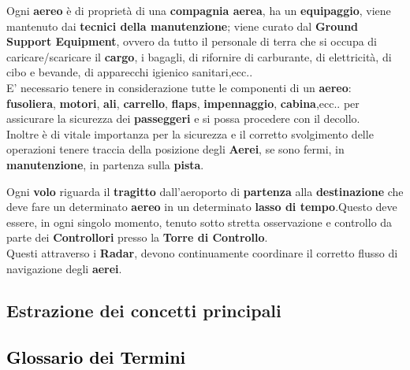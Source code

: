 \textsf{\small Ogni \textbf{aereo} è di proprietà di una \textbf{compagnia aerea}, ha un \textbf{equipaggio}, viene mantenuto dai \textbf{tecnici della manutenzione}; viene curato dal \textbf{Ground Support Equipment}, ovvero da tutto il personale di terra che si occupa di caricare/scaricare il \textbf{cargo}, i bagagli, di rifornire di carburante, di elettricità, di cibo e bevande, di apparecchi igienico sanitari,ecc.. }\\

\textsf{\small E' necessario tenere in considerazione tutte le componenti di un \textbf{aereo}: \textbf{fusoliera}, \textbf{motori}, \textbf{ali}, \textbf{carrello}, \textbf{flaps}, \textbf{impennaggio}, \textbf{cabina},ecc.. per assicurare la sicurezza dei \textbf{passeggeri} e si possa procedere con il decollo.}\\

\textsf{\small Inoltre è di vitale importanza per la sicurezza e il corretto svolgimento delle operazioni tenere traccia della posizione degli \textbf{Aerei}, se sono fermi, in \textbf{manutenzione}, in partenza sulla \textbf{pista}.}\break

\textsf{\small Ogni \textbf{volo} riguarda il \textbf{tragitto} dall'aeroporto di \textbf{partenza} alla \textbf{destinazione} che deve fare un determinato \textbf{aereo} in un determinato \textbf{lasso di tempo}.Questo deve essere, in ogni singolo momento, tenuto sotto stretta osservazione e controllo da parte dei \textbf{Controllori} presso la \textbf{Torre di Controllo}.}\\

\textsf{\small Questi attraverso i \textbf{Radar}, devono continuamente coordinare il corretto flusso di navigazione degli \textbf{aerei}.}\\

\newpage

\enlargethispage{1\linewidth}

\subsection{Estrazione dei concetti principali}

\subsection{\textcolor{black}{Glossario dei Termini}}

